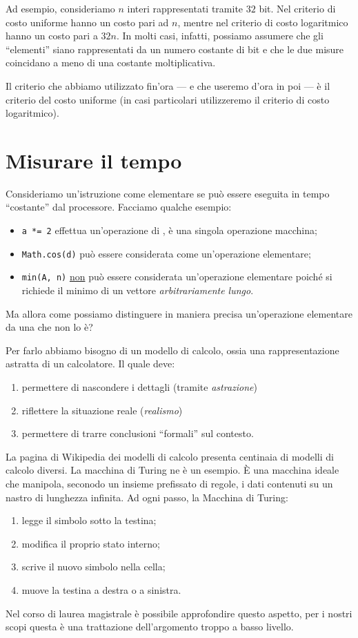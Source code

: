 Ad esempio, consideriamo \(n\) interi rappresentati tramite \(32\) bit.
Nel criterio di costo uniforme hanno un costo pari ad \(n\), mentre nel criterio di costo logaritmico hanno un costo pari a \(32n\).
In molti casi, infatti, possiamo assumere che gli \enquote{elementi} siano rappresentati da un numero costante di bit e che le due misure coincidano a meno di una costante moltiplicativa.

Il criterio che abbiamo utilizzato fin'ora --- e che useremo d'ora in poi --- è il criterio del costo uniforme (in casi particolari utilizzeremo il criterio di costo logaritmico).

\section{Misurare il tempo}

Consideriamo un'istruzione come elementare se può essere eseguita in tempo \enquote{costante} dal processore.
Facciamo qualche esempio:
\begin{itemize}
	\item \texttt{a *= 2} effettua un'operazione di , è una singola operazione macchina;
	\item \texttt{Math.cos(d)} può essere considerata come un'operazione elementare;
	\item \texttt{min(A, n)} \underline{non} può essere considerata un'operazione elementare poiché si richiede il minimo di un vettore \emph{arbitrariamente lungo}.
\end{itemize}

Ma allora come possiamo distinguere in maniera precisa un'operazione elementare da una che non lo è?

Per farlo abbiamo bisogno di un modello di calcolo, ossia una rappresentazione astratta di un calcolatore.
Il quale deve:
\begin{enumerate}
	\item permettere di nascondere i dettagli (tramite \emph{astrazione})
	\item riflettere la situazione reale (\emph{realismo})
	\item permettere di trarre conclusioni \enquote{formali} sul contesto.
\end{enumerate}
La pagina di Wikipedia dei modelli di calcolo presenta centinaia di modelli di calcolo diversi.
La macchina di Turing ne è un esempio.
\`{E} una macchina ideale che manipola, seconodo un insieme prefissato di regole, i dati contenuti su un nastro di lunghezza infinita.
Ad ogni passo, la Macchina di Turing:
\begin{enumerate}
	\item legge il simbolo sotto la testina;
	\item modifica il proprio stato interno;
	\item scrive il nuovo simbolo nella cella;
	\item muove la testina a destra o a sinistra.
\end{enumerate}
Nel corso di laurea magistrale è possibile approfondire questo aspetto, per i nostri scopi questa è una trattazione dell'argomento troppo a basso livello.

